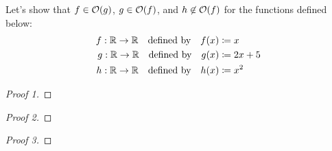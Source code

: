 \begin{example}
    Let's show that $f \in \O{g}$, $g \in \O{f}$, and $h \not \in \O{f}$ for the functions defined below:
    \begin{align*}
        f: \mathbb{R} \to \mathbb{R}~~\text{ defined by }~~f(x) &\coloneqq x\\
        g: \mathbb{R} \to \mathbb{R}~~\text{ defined by }~~g(x) &\coloneqq 2x + 5\\
        h: \mathbb{R} \to \mathbb{R}~~\text{ defined by }~~h(x) &\coloneqq x^2
    \end{align*}
    \begin{proof}[Proof 1]
    \end{proof}
    \begin{proof}[Proof 2]
    \end{proof}
    \begin{proof}[Proof 3]
    \end{proof}
\end{example}


